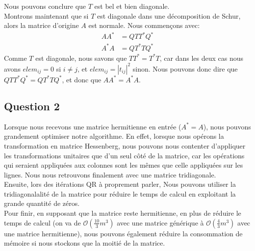 \documentclass[11pt]{article}
\begin{document}
Nous pouvons conclure que $T$ est bel et bien diagonale.\\
Montrons maintenant que si $T$ est diagonale dans une décomposition de Schur, alors la matrice d'origine $A$ est normale. Nous commençons avec:
\begin{align}
	AA^* &= QTT^*Q^*\\
	A^*A &= QT^*TQ^*
\end{align}
Comme $T$ est diagonale, nous savons que $TT^* = T^*T$, car dans les deux cas nous avons $elem_{ij} = 0$ si $i \neq j$, et $elem_{ij} = |t_{ij}|^2$ sinon. Nous pouvons donc dire que $QTT^*Q^* = QT^*TQ^*$, et donc que $AA^* = A^*A$.

\subsection*{Question 2}
Lorsque nous recevons une matrice hermitienne en entrée ($A^*=A$), nous pouvons grandement optimiser notre algorithme. En effet, lorsque nous opérons la transformation en matrice Hessenberg, nous pouvons nous contenter d'appliquer les transformations unitaires que d'un seul côté de la matrice, car les opérations qui seraient appliquées aux colonnes sont les mêmes que celle appliquées sur les lignes. Nous nous retrouvons finalement avec une matrice tridiagonale.\\
Ensuite, lors des itérations QR à proprement parler, Nous pouvons utiliser la tridiagonalalité de la matrice pour réduire le temps de calcul en exploitant la grande quantité de zéros.\\
Pour finir, en supposant que la matrice reste hermitienne, en plus de réduire le temps de calcul (on va de $\mathcal{O}(\frac{10}{3}m^3)$ avec une matrice générique à $\mathcal{O}(\frac{4}{3}m^3)$ avec une matrice hermitienne), nous pouvons également réduire la consommation de mémoire si nous stockons que la moitié de la matrice.
\end{document}
